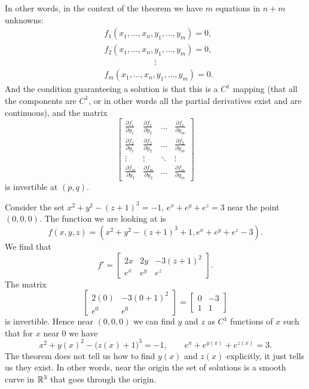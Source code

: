 In other words, in the context of the theorem we have
$m$ equations in $n+m$ unknowns:
\begin{align*}
& f_1 (x_1,\ldots,x_n,y_1,\ldots,y_m) = 0 , \\
& f_2 (x_1,\ldots,x_n,y_1,\ldots,y_m) = 0 , \\
& \qquad \qquad \qquad  \vdots \\
& f_m (x_1,\ldots,x_n,y_1,\ldots,y_m) = 0 .
\end{align*}
And the condition guaranteeing a solution is that this is a $C^1$ mapping (that all the components are
$C^1$, or in other words all the partial derivatives exist
and are continuous), and the matrix
\begin{equation*}
\begin{bmatrix}
\frac{\partial f_1}{\partial y_1}
&
\frac{\partial f_1}{\partial y_2}
& \ldots &
\frac{\partial f_1}{\partial y_m}
\\[6pt]
\frac{\partial f_2}{\partial y_1}
&
\frac{\partial f_2}{\partial y_2}
& \ldots &
\frac{\partial f_2}{\partial y_m}
\\
\vdots & \vdots & \ddots & \vdots
\\
\frac{\partial f_m}{\partial y_1}
&
\frac{\partial f_m}{\partial y_2}
& \ldots &
\frac{\partial f_m}{\partial y_m}
\end{bmatrix}
\end{equation*}
is invertible at $(p,q)$.

\begin{example}
Consider the set $x^2+y^2-{(z+1)}^3 = -1$, $e^x+e^y+e^z = 3$
near the point $(0,0,0)$.
The function we are looking at is
\begin{equation*}
f(x,y,z) = (x^2+y^2-{(z+1)}^3+1,e^x+e^y+e^z-3) .
\end{equation*}
We find that
\begin{equation*}
f' =
\begin{bmatrix}
2x & 2y & -3{(z+1)}^2 \\
e^x & e^y & e^z
\end{bmatrix} .
\end{equation*}
The matrix
\begin{equation*}
\begin{bmatrix}
2(0) & -3{(0+1)}^2 \\
e^0 & e^0
\end{bmatrix}
=
\begin{bmatrix}
0 & -3 \\
1 & 1
\end{bmatrix}
\end{equation*}
is invertible.  Hence near $(0,0,0)$ we can find $y$ and $z$
as $C^1$ functions of $x$ such that for $x$ near 0 we have
\begin{equation*}
x^2+y(x)^2-{\bigl(z(x)+1\bigr)}^3 = -1,
\qquad
e^x+e^{y(x)}+e^{z(x)} = 3 .
\end{equation*}
The theorem does not tell us how to find $y(x)$ and $z(x)$ explicitly,
it just tells us they exist.
In other words, near the origin the set of solutions is a
smooth curve in ${\mathbb{R}}^3$ that goes through the origin.
\end{example}


